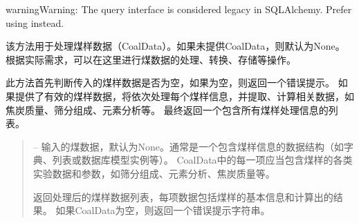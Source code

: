 \documentclass[a4paper,12pt,english]{sphinxmanual}
\begin{document}
\begin{fulllineitems}
\begin{fulllineitems}
\begin{sphinxadmonition}{warning}{Warning:}
\sphinxAtStartPar
The query interface is considered legacy in SQLAlchemy. Prefer using
 instead.
\end{sphinxadmonition}

\end{fulllineitems}


\begin{fulllineitems}
\label{\detokenize{api/coalData:coalData.CoalDataGeneration.ratio_coke}}
\pysigstartsignatures
{}
\pysigstopsignatures
\end{fulllineitems}


\begin{fulllineitems}
\label{\detokenize{api/coalData:coalData.CoalDataGeneration.response}}
\pysigstartsignatures
{}
\pysigstopsignatures
\sphinxAtStartPar
该方法用于处理煤样数据（CoalData）。如果未提供CoalData，则默认为None。
根据实际需求，可以在这里进行煤数据的处理、转换、存储等操作。

\sphinxAtStartPar
此方法首先判断传入的煤样数据是否为空，如果为空，则返回一个错误提示。
如果提供了有效的煤样数据，将依次处理每个煤样信息，并提取、计算相关数据，如焦炭质量、筛分组成、元素分析等。
最终返回一个包含所有煤样处理信息的列表。
\begin{quote}\begin{description}
\sphinxAtStartPar
{} – 输入的煤数据，默认为None。通常是一个包含煤样信息的数据结构（如字典、列表或数据库模型实例等）。
CoalData中的每一项应当包含煤样的各类实验数据和参数，如筛分组成、元素分析、焦炭质量等。

\sphinxAtStartPar
返回处理后的煤样数据列表，每项数据包括煤样的基本信息和计算出的结果。
如果CoalData为空，则返回一个错误提示字符串。

\end{description}\end{quote}


\end{fulllineitems}
\end{fulllineitems}
\end{document}
